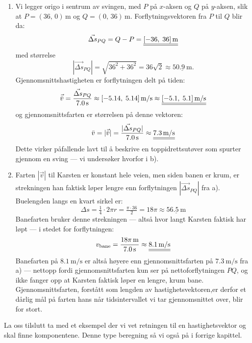 {\begin{enumerate}[\textbf{\alph*)}]
  \item Vi legger origo i sentrum av svingen, med $P$ på $x$-aksen og $Q$ på $y$-aksen, slik at $P=(36,\,0)\,\si{\metre}$ og $Q=(0,\,36)\,\si{\metre}$. Forflytningsvektoren fra $P$ til $Q$ blir da:
        \[\vec{\Delta s}_{PQ}=Q-P=\underline{\underline{[-36,\;36]\,\text{m}}}\]
        med størrelse
        \[|\vec{\Delta s}_{PQ}|=\sqrt{36^2+36^2}=36\sqrt{2}\approx \underline{\SI{50.9}{\metre}}.\]
        Gjennomsnittshastigheten er forflytningen delt på tiden:
        \[\vec{\bar{v}}=\frac{\vec{\Delta s}_{PQ}}{7.0\,\text{s}}\approx [-5.14,\;5.14]\,\text{m/s} \approx \underline{\underline{[-5.1,\;5.1]\,\text{m/s}}}\]
        og gjennomsnittsfarten er størrelsen på denne vektoren:
        \[\bar{v}=|\vec{\bar{v}}|=\frac{|\vec{\Delta s}_{PQ}|}{7.0\,\text{s}}\approx \underline{\underline{7.3\,\text{m/s}}}\]
        Dette virker påfallende lavt til å beskrive en toppidrettsutøver som spurter gjennom en sving --- vi undersøker hvorfor i b).
  \item Farten $|\vec{v}|$ til Karsten er konstant hele veien, men siden banen er krum, er strekningen han faktisk løper lengre enn forflytningen $|\vec{\Delta s}_{PQ}|$ fra a). Buelengden langs en kvart sirkel er:
        \[\Delta s=\tfrac{1}{4}\cdot 2\pi r=\tfrac{\pi\cdot 36}{2}=18\pi\approx \underline{\SI{56.5}{\metre}}\]
        Banefarten bruker denne strekningen --- altså hvor langt Karsten faktisk har løpt --- i stedet for forflytningen:
        \[v_{\text{bane}}=\frac{18\pi\,\text{m}}{7.0\,\text{s}}\approx \underline{\underline{8.1\,\text{m/s}}}\]
        Banefarten på $\SI{8.1}{\metre\per\second}$ er altså høyere enn gjennomsnittsfarten på $\SI{7.3}{\metre\per\second}$ fra a) --- nettopp fordi gjennomsnittsfarten kun ser på nettoforflytningen $PQ$, og ikke fanger opp at Karsten faktisk løper en lengre, krum bane. Gjennomsnittsfarten, forstått som lengden av hastighetsvektoren,er derfor et dårlig mål på farten hans når tidsintervallet vi tar gjennomsnittet over, blir for stort.
\end{enumerate}
}

La oss tilslutt ta med et eksempel der vi vet retningen til en hastighetsvektor og skal finne komponentene. Denne type beregning så vi også på i forrige kapittel. 

